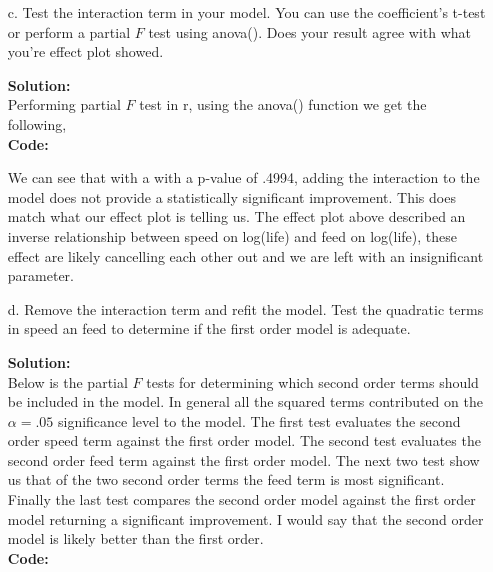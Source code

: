 \documentclass[12pt]{article}
\makeatletter
\theoremstyle{homework}
\newenvironment{exercise}[1]
{\def\@currentlabel{#1}\exercisecore}
{\endexercisecore}
\newcommand{\localhead}[1]{\par\smallskip\noindent\textbf{#1}\nobreak\\}%
\newcommand\solution{\localhead{Solution:}}
\makeatother
\begin{document}
\begin{exercise}{1}
\begin{enumerate}
        \item[c.] Test the interaction term in your model. You can use the coefficient's t-test 
        or perform a partial $F$ test using anova(). Does your result agree with what you're effect plot
        showed.\\
        \solution Performing partial $F$ test in r, using the anova() function we get the following, \\
        \textbf{Code:}
        \begin{center}
        
        \end{center} 
        We can see that with a with a p-value of .4994, adding the interaction to the model does not provide a statistically
        significant improvement. This does match what our effect plot is telling us. The effect plot above described an inverse
        relationship between speed on log(life) and feed on log(life), these effect are likely cancelling each other out and we are 
        left with an insignificant parameter. 
        \newpage
        
        \item[d.] Remove the interaction term and refit the model. Test the quadratic terms in speed an feed to determine 
        if the first order model is adequate.  \\
        \solution Below is the partial $F$ tests for determining which second order terms should be included in the model. In general 
        all the squared terms contributed on the $\alpha = .05$ significance level to the model. The first test evaluates the second order
        speed term against the first order model. The second test evaluates the second order feed term against the first order model. The 
        next two test show us that of the two second order terms the feed term is most significant. Finally the last test compares the second order 
        model against the first order model returning a significant improvement. I would say that the second order model is likely better than the first 
        order.\\
        \textbf{Code:}
        \begin{center}
        
        \end{center} 
    \end{enumerate}
 \end{exercise}
 \newpage
\end{document}
